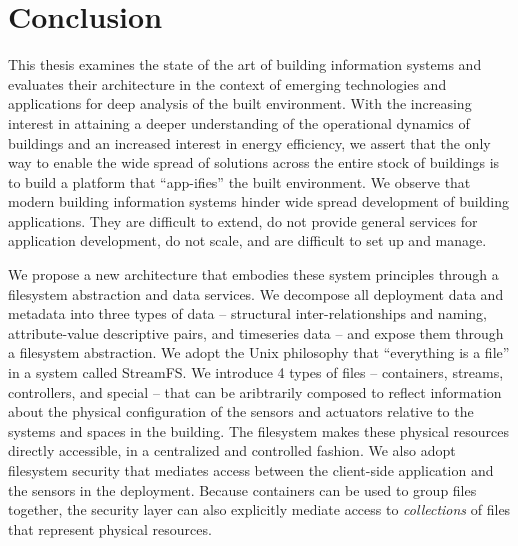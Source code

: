 \documentclass{ucbthesis}
\begin{document}
\pagestyle{headings}










\chapter{Conclusion}
\label{chap:done}

This thesis examines the state of the art of building information systems and evaluates their architecture in the context
of emerging technologies and applications for deep analysis of the built environment.  With the increasing interest in
attaining a deeper understanding of the operational dynamics of buildings and an increased interest in energy efficiency,
we assert that the only way to enable the wide spread of solutions across the entire stock of buildings is to build a platform
that ``app-ifies'' the built environment.  We observe that modern building information systems hinder wide spread development 
of building applications.  They are difficult to extend, do not provide general services for application development, do not
scale, and are difficult to set up and manage.  

We propose a new architecture that embodies these system principles through a filesystem abstraction and data services.  We decompose
all deployment data and metadata into three types of data -- structural inter-relationships and naming, attribute-value descriptive pairs,
and timeseries data -- and expose them through a filesystem abstraction.  We adopt the Unix philosophy that ``everything is a file'' in a
system called StreamFS.  We introduce 4 types of files -- containers, streams, controllers, and special -- that can be aribtrarily
composed to reflect information about the physical configuration of the sensors and actuators relative to the systems and spaces in
the building.  The filesystem makes these physical resources directly accessible, in a centralized and controlled fashion.  We
also adopt filesystem security that mediates access between the client-side application and the sensors in the deployment.
Because containers can be used to group files together, the security layer can also explicitly mediate access to \emph{collections}
of files that represent physical resources.
\end{document}
